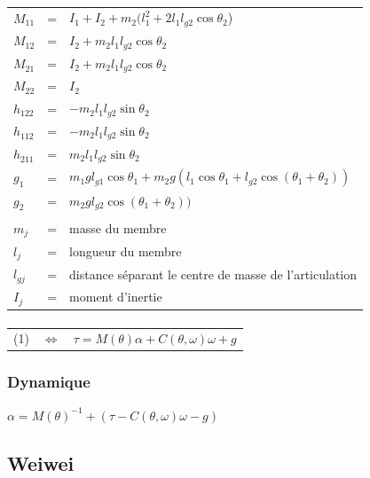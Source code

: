 \documentclass[pdftex,a4paper,11pt]{article}
\begin{document}
\paragraph{}
\begin{tabular}{lcl}
    $M_{11}$ & = & $I_1 + I_2 + m_2(l_1^2 + 2 l_1 l_{g2}\cos\theta_2$) \\
    $M_{12}$ & = & $I_2 + m_2l_1l_{g2}\cos\theta_2$ \\
    $M_{21}$ & = & $I_2 + m_2l_1l_{g2}\cos\theta_2$ \\
    $M_{22}$ & = & $I_2$ \\
    $h_{122}$ & = & $-m_2 l_1 l_{g2} \sin\theta_2$ \\
    $h_{112}$ & = & $-m_2 l_1 l_{g2} \sin\theta_2$ \\
    $h_{211}$ & = & $m_2 l_1 l_{g2} \sin\theta_2$ \\
    $g_1$ & = & $m_1 g l_{g1} \cos\theta_1 + m_2 g(l_1 \cos\theta_1 + l_{g2} \cos(\theta_1 + \theta_2))$ \\
    $g_2$ & = & $m_2 g l_{g2} \cos(\theta_1 + \theta_2))$ \\
    & & \\
    $m_j$ & = & masse du membre \\
    $l_j$ & = & longueur du membre \\
    $l_{gj}$ & = & distance séparant le centre de masse de l'articulation \\
    $I_{j}$ & = & moment d'inertie \\
\end{tabular}

\paragraph{}
\begin{tabular}{lcl}
    (1) & $\Leftrightarrow$ & $\tau = M(\theta)\alpha + C(\theta, \omega) \omega + g$ \\
\end{tabular}

\subsubsection{Dynamique}
$\alpha = M(\theta)^{-1} + (\tau - C(\theta, \omega) \omega - g) $


\subsection{Weiwei}
\end{document}
